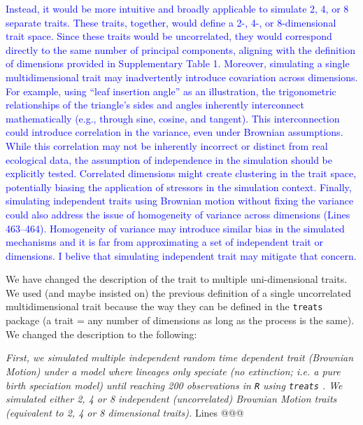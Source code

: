 \documentclass[
]{article}
\begin{document}
\textcolor{blue}{Instead, it would be more intuitive and broadly applicable to simulate 2, 4, or 8 separate traits.
These traits, together, would define a 2-, 4-, or 8-dimensional trait space.
Since these traits would be uncorrelated, they would correspond directly to the same number of principal components, aligning with the definition of dimensions provided in Supplementary Table 1.
Moreover, simulating a single multidimensional trait may inadvertently introduce covariation across dimensions.
For example, using “leaf insertion angle” as an illustration, the trigonometric relationships of the triangle’s sides and angles inherently interconnect mathematically (e.g., through sine, cosine, and tangent).
This interconnection could introduce correlation in the variance, even under Brownian assumptions.
While this correlation may not be inherently incorrect or distinct from real ecological data, the assumption of independence in the simulation should be explicitly tested.
Correlated dimensions might create clustering in the trait space, potentially biasing the application of stressors in the simulation context. 
Finally, simulating independent traits using Brownian motion without fixing the variance could also address the issue of homogeneity of variance across dimensions (Lines 463–464).
Homogeneity of variance may introduce similar bias in the simulated mechanisms and it is far from approximating a set of independent trait or dimensions.
I belive that simulating independent trait may mitigate that concern.}

We have changed the description of the trait to multiple uni-dimensional traits.
We used (and maybe insisted on) the previous definition of a single uncorrelated multidimensional trait because the way they can be defined in the \texttt{treats} package (a trait = any number of dimensions as long as the process is the same).
We changed the description to the following:

\textit{First, we simulated multiple independent random time dependent trait (Brownian Motion) under a model where lineages only speciate (no extinction; i.e. a pure birth speciation model) until reaching 200 observations in \texttt{R} \citep{rcore} using \texttt{treats} \citep{guillerme2024treats}.
We simulated either 2, 4 or 8 independent (uncorrelated) Brownian Motion traits (equivalent to 2, 4 or 8 dimensional traits).} Lines @@@
\end{document}

